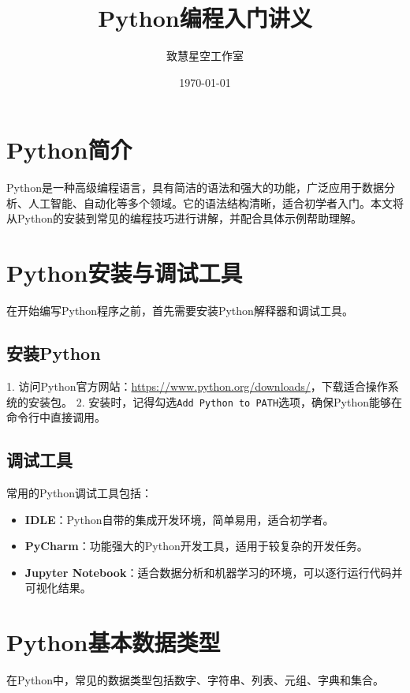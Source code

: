 \documentclass{article}
\title{Python编程入门讲义}
\author{致慧星空工作室}
\date{\today}
\begin{document}
\thispagestyle{empty}  %
\vspace*{5cm}  %
\centerline{\Huge\textbf{\thetitle}}
\vspace*{10cm}
\centerline{\Large\textbf{\theauthor}}
\vspace*{1cm}
\centerline{\large\thedate}
\newpage

\tableofcontents
\newpage

\section{Python简介}
Python是一种高级编程语言，具有简洁的语法和强大的功能，广泛应用于数据分析、人工智能、自动化等多个领域。它的语法结构清晰，适合初学者入门。本文将从Python的安装到常见的编程技巧进行讲解，并配合具体示例帮助理解。

\section{Python安装与调试工具}
在开始编写Python程序之前，首先需要安装Python解释器和调试工具。

\subsection{安装Python}
1. 访问Python官方网站：\href{https://www.python.org/downloads/}{https://www.python.org/downloads/}，下载适合操作系统的安装包。
2. 安装时，记得勾选\texttt{Add Python to PATH}选项，确保Python能够在命令行中直接调用。

\subsection{调试工具}
常用的Python调试工具包括：
\begin{itemize}
    \item \textbf{IDLE}：Python自带的集成开发环境，简单易用，适合初学者。
    \item \textbf{PyCharm}：功能强大的Python开发工具，适用于较复杂的开发任务。
    \item \textbf{Jupyter Notebook}：适合数据分析和机器学习的环境，可以逐行运行代码并可视化结果。
\end{itemize}

\section{Python基本数据类型}
在Python中，常见的数据类型包括数字、字符串、列表、元组、字典和集合。
\end{document}
